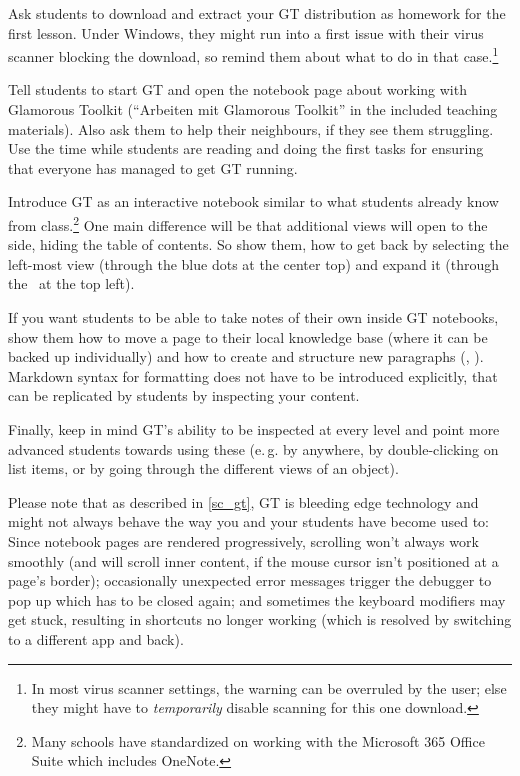 \begin{instructions}
\item Ask students to download and extract your \ac{GT} distribution as homework for the first lesson. Under Windows, they might run into a first issue with their virus scanner blocking the download, so remind them about what to do in that case.\footnote{In most virus scanner settings, the warning can be overruled by the user; else they might have to \emph{temporarily} disable scanning for this one download.}
\item Tell students to start \ac{GT} and open the notebook page about working with Glamorous Toolkit (``Arbeiten mit Glamorous Toolkit'' in the included teaching materials). Also ask them to help their neighbours, if they see them struggling. Use the time while students are reading and doing the first tasks for ensuring that everyone has managed to get \ac{GT} running.
\item Introduce \ac{GT} as an interactive notebook similar to what students already know from class.\footnote{Many schools have standardized on working with the Microsoft 365 Office Suite which includes OneNote.} One main difference will be that additional views will open to the side, hiding the table of contents. So show them, how to get back by selecting the left-most view (through the blue dots at the center top) and expand it (through the \faPlusCircle\ at the top left).
\item If you want students to be able to take notes of their own inside \ac{GT} notebooks, show them how to move a page to their local knowledge base (where it can be backed up individually) and how to create and structure new paragraphs (, ). Markdown syntax for formatting does not have to be introduced explicitly, that can be replicated by students by inspecting your content.
\item Finally, keep in mind \ac{GT}'s ability to be inspected at every level and point more advanced students towards using these (e.\,g. by  anywhere, by double-clicking on list items, or by going through the different views of an object).
\end{instructions}

Please note that as described in \ref{sc_gt}, \ac{GT} is bleeding edge technology and might not always behave the way you and your students have become used to: Since notebook pages are rendered progressively, scrolling won't always work smoothly (and will scroll inner content, if the mouse cursor isn't positioned at a page's border); occasionally unexpected error messages trigger the debugger to pop up which has to be closed again; and sometimes the keyboard modifiers may get stuck, resulting in shortcuts no longer working (which is resolved by switching to a different app and back).



